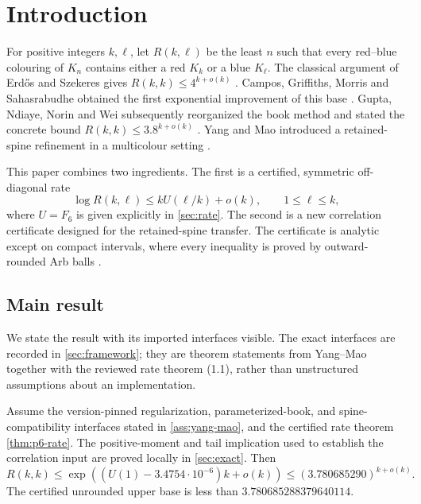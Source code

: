 \section{Introduction}

For positive integers \(k,\ell\), let \(R(k,\ell)\) be the least \(n\) such
that every red--blue colouring of \(K_n\) contains either a red \(K_k\) or a
blue \(K_\ell\).  The classical argument of Erd\H{o}s and Szekeres gives
\(R(k,k)\le 4^{k+o(k)}\) \cite{ErdosSzekeres1935}.  Campos, Griffiths,
Morris and Sahasrabudhe obtained the first exponential improvement of this
base \cite{CGMS2023}.  Gupta, Ndiaye, Norin and Wei subsequently reorganized
the book method and stated the concrete bound \(R(k,k)\le3.8^{k+o(k)}\)
\cite{GNNW2024}.  Yang and Mao introduced a retained-spine refinement in a
multicolour setting \cite{YangMao2026}.

This paper combines two ingredients.  The first is a certified, symmetric
off-diagonal rate
\[
 \log R(k,\ell)\le kU(\ell/k)+o(k),\qquad 1\le \ell\le k,
 \tag{1.1}
\]
where \(U=F_6\) is given explicitly in \cref{sec:rate}.  The second is a new
correlation certificate designed for the retained-spine transfer.  The
certificate is analytic except on compact intervals, where every inequality
is proved by outward-rounded Arb balls \cite{Johansson2017}.

\subsection{Main result}

We state the result with its imported interfaces visible.  The exact
interfaces are recorded in \cref{sec:framework}; they are theorem statements
from Yang--Mao together with the reviewed rate theorem (1.1), rather than
unstructured assumptions about an implementation.

\begin{theorem}\label{thm:main-upper}
Assume the version-pinned regularization, parameterized-book, and
spine-compatibility interfaces stated in \cref{ass:yang-mao}, and the
certified rate theorem \cref{thm:p6-rate}.  The positive-moment and tail
implication used to establish the correlation input are proved locally in
\cref{sec:exact}.  Then
\[
 R(k,k)\le \exp\!\left((U(1)-3.4754\cdot10^{-6})k+o(k)\right)
 \le (3.780685290)^{k+o(k)}.
\]
The certified unrounded upper base is less than
\(3.780685288379640114\).
\end{theorem}

